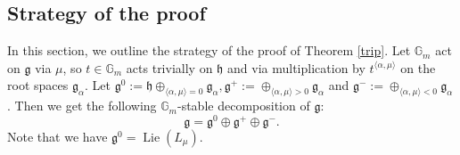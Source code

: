 \documentclass{amsart}
\newcommand{\gm}{\mathbb{G}_{m}}
\theoremstyle{plain}
\theoremstyle{definition}
\theoremstyle{remark}
\DeclareMathOperator{\lie}{Lie}
\begin{document}
\subsection{Strategy of the proof}\label{strategy of the proof}
In this section, we outline the strategy of the proof of Theorem \ref{trip}.
Let $\mathbb{G}_{m}$ act on $\mathfrak{g}$ via $\mu$, so $t\in\gm$ acts trivially on $\mathfrak{h}$ and via multiplication by $t^{\langle\alpha,\mu\rangle}$ on the root spaces $\mathfrak{g}_{\alpha}$. 
Let $\mathfrak{g}^{0}:=\mathfrak{h}\oplus_{\langle\alpha,\mu\rangle=0}\mathfrak{g}_{\alpha},\mathfrak{g}^{+}:=\oplus_{\langle\alpha,\mu\rangle>0}\mathfrak{g}_{\alpha}$ and $\mathfrak{g}^{-}:=\oplus_{\langle\alpha,\mu\rangle<0}\mathfrak{g}_{\alpha}$. Then we get the following $\mathbb{G}_{m}$-stable decomposition of $\mathfrak{g}$:
\begin{equation}\label{decomposition of g}
\mathfrak{g}=\mathfrak{g}^{0}\oplus\mathfrak{g}^{+}\oplus\mathfrak{g}^{-}.
\end{equation}
Note that we have $\mathfrak{g}^{0}=\lie(L_{\mu})$.
\end{document}
